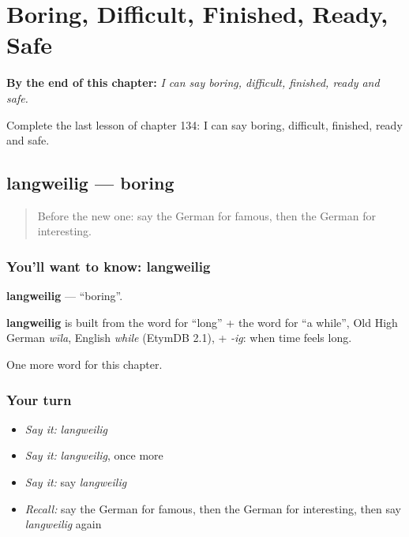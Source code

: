 
\chapter{Boring, Difficult, Finished, Ready, Safe}
\label{ch:ge-boring-difficult-finished-ready-safe}

\begin{chapteropening}
\textbf{By the end of this chapter:} \emph{I can say boring, difficult, finished, ready and safe.}

Complete the last lesson of chapter 134: I can say boring, difficult, finished, ready and safe.
\end{chapteropening}

\section[langweilig]{langweilig — boring}

\label{lesson:GE-C134-langweilig}



\begin{quote}
Before the new one: say the German for famous, then the German for interesting.
\end{quote}

\subsection*{You'll want to know: langweilig}
\textbf{langweilig} — \textquotedblleft{}boring\textquotedblright{}.

\begin{cousinweb}
\textbf{langweilig} is built from the word for \textquotedblleft{}long\textquotedblright{} + the word for \textquotedblleft{}a while\textquotedblright{}, Old High German \emph{wīla}, English \emph{while} (EtymDB 2.1), + \emph{-ig}: when time feels long.
\end{cousinweb}

\begin{grammarlens}[title={What you've built}]
One more word for this chapter.
\end{grammarlens}

\subsection*{Your turn}
\begin{itemize}
\raggedright
  \item \emph{Say it:} \emph{langweilig}
  \item \emph{Say it:} \emph{langweilig}, once more
  \item \emph{Say it:} say \emph{langweilig}
  \item \emph{Recall:} say the German for famous, then the German for interesting, then say \emph{langweilig} again
\end{itemize}

